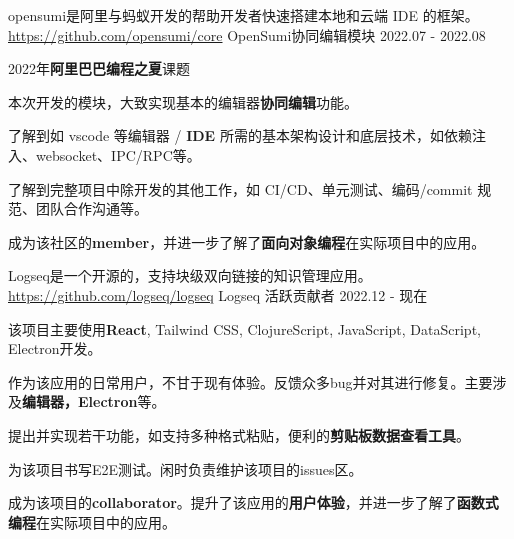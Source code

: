 

\begin{cventries}


\cventry
    {opensumi是阿里与蚂蚁开发的帮助开发者快速搭建本地和云端 IDE 的框架。\href{https://github.com/opensumi/core}{https://github.com/opensumi/core}} %
    {OpenSumi协同编辑模块} %
    {} %
    {2022.07 - 2022.08} %
    {
      \begin{cvitems} %
        \item {2022年\textbf{阿里巴巴编程之夏}课题}
        \item {本次开发的模块，大致实现基本的编辑器\textbf{协同编辑}功能。}
        \item {了解到如 vscode 等编辑器 / \textbf{IDE} 所需的基本架构设计和底层技术，如依赖注入、websocket、IPC/RPC等。}
        \item {了解到完整项目中除开发的其他工作，如 CI/CD、单元测试、编码/commit 规范、团队合作沟通等。}
        \item {成为该社区的\textbf{member}，并进一步了解了\textbf{面向对象编程}在实际项目中的应用。}
      \end{cvitems}
    }


\cventry
    {Logseq是一个开源的，支持块级双向链接的知识管理应用。\href{https://github.com/logseq/logseq}{https://github.com/logseq/logseq}} %
    {Logseq 活跃贡献者} %
    {} %
    {2022.12 - 现在} %
    {
      \begin{cvitems} %
        \item {该项目主要使用\textbf{React}, Tailwind CSS, ClojureScript, JavaScript, DataScript, Electron开发。}
        \item {作为该应用的日常用户，不甘于现有体验。反馈众多bug并对其进行修复。主要涉及\textbf{编辑器，Electron}等。}
        \item {提出并实现若干功能，如支持多种格式粘贴，便利的\textbf{剪贴板数据查看工具}。}
        \item {为该项目书写E2E测试。闲时负责维护该项目的issues区。}
        \item {成为该项目的\textbf{collaborator}。提升了该应用的\textbf{用户体验}，并进一步了解了\textbf{函数式编程}在实际项目中的应用。}
      \end{cvitems}
    }

\end{cventries}

